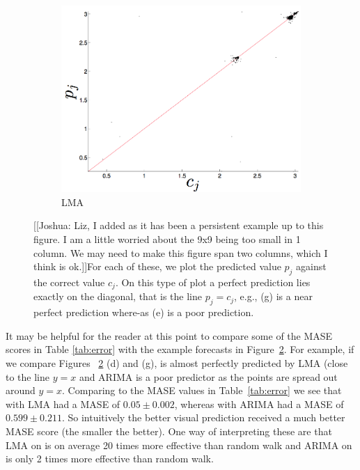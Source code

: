 \begin{figure}[htbp]
\begin{subfigure}{0.32\columnwidth}
    \includegraphics[width=\columnwidth]{figs/svdfiveLMAForecast.png}
    \caption{\svdfive LMA}
    \label{fig:gccLMA}
  \end{subfigure}
   \caption{
{\color{red}[[Joshua: Liz, I added \svdfive as it has been a persistent example up to this figure. I am a little worried about the 9x9 being too small in 1 column. We may need to make this figure span two columns, which I think is ok.]]}For each of these, we plot the predicted value $p_j$ against the correct value $c_j$. On this type of plot a perfect prediction lies exactly on the diagonal, that is the line $p_j = c_j$, e.g., (g) is a near perfect prediction where-as (e) is a poor prediction.}\label{fig:forecast-example}  
\end{figure} 

It may be helpful for the reader at this point to compare some of the MASE scores in Table \ref{tab:error} with the example forecasts in Figure~\ref{fig:forecast-example}. For example, if we compare Figures~ \ref{fig:forecast-example} (d) and (g), \col is almost perfectly predicted by LMA (close to the line $y=x$ and ARIMA is a poor predictor as the points are spread out around $y=x$. Comparing to the MASE values in Table~\ref{tab:error} we see that \col with LMA had a MASE of $0.05 \pm 0.002$, whereas \col with ARIMA had a MASE of $0.599 \pm 0.211$. So intuitively the better visual prediction received a much better MASE score (the smaller the better). One way of interpreting these are that LMA on \col is on average 20 times more effective than random walk and ARIMA on \col is only 2 times more effective than random walk. 

